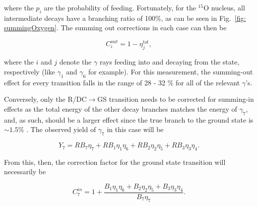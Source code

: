 \noindent where the $p_{i}$ are the probability of feeding. Fortunately, for the $^{15}$O nucleus, all intermediate decays have a branching ratio of 100\%, as can be seen in Fig.\ \ref{fig: summingOxygen}. The summing out corrections in each case can then be

\begin{equation}
C_{i}^{out} = 1 - \eta^{tot}_{j},
\end{equation}

\noindent where the $i$ and $j$ denote the $\gamma$ rays feeding into and decaying from the state, respectively (like $\gamma_{1}$ and $\gamma_{6}$ for example). For this measurement, the summing-out effect for every transition falls in the range of 28 - 32 \% for all of the relevant $\gamma$'s. %




Conversely, only the R/DC$\rightarrow$GS transition needs to be corrected for summing-in effects as the total energy of the other decay branches matches the energy of $\gamma_{7}$, and, as such, should be a larger effect since the true branch to the ground state is $\sim 1.5$\% \cite{Daigle2016}. The observed yield of $\gamma_{7}$ in this case will be

\begin{equation}
Y_{7} = R B_{7} \eta_{7} + R B_{1} \eta_{1} \eta_{6} +  R B_{2} \eta_{2} \eta_{5} + R B_{3} \eta_{3} \eta_{4} .
\end{equation}

\noindent From this, then, the correction factor for the ground state transition will necessarily be

\begin{equation}
C_{7}^{in} = 1 + \dfrac{B_{1} \eta_{1} \eta_{6} + B_{2} \eta_{2} \eta_{5} + B_{3} \eta_{3} \eta_{4} }{B_{7} \eta_{7}}.
\end{equation}


